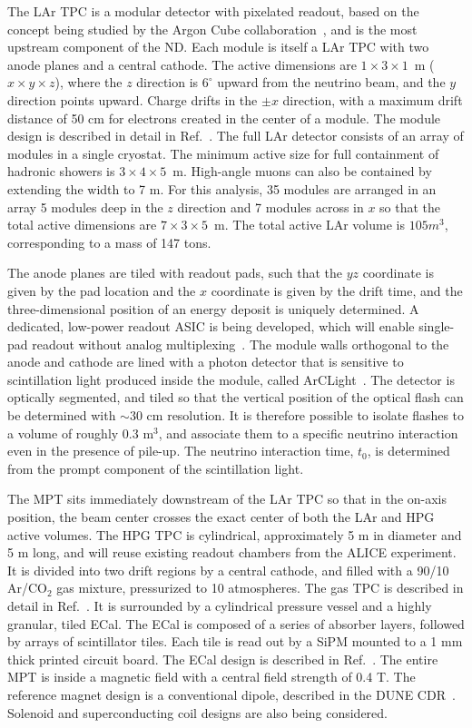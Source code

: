 The LAr TPC is a modular detector with pixelated readout, based on the concept being studied by the Argon Cube collaboration~\cite{ArgonCube}, and is the most upstream component of the ND. Each module is itself a LAr TPC with two anode planes and a central cathode. The active dimensions are $1 \times 3 \times 1$~m ($x \times y \times z$), where the $z$ direction is $6^{\circ}$ upward from the neutrino beam, and the $y$ direction points upward. Charge drifts in the $\pm x$ direction, with a maximum drift distance of 50 cm for electrons created in the center of a module. The module design is described in detail in Ref.~\cite{ArgonCube}. The full LAr detector consists of an array of modules in a single cryostat. The minimum active size for full containment of hadronic showers is $3 \times 4 \times 5$~m. High-angle muons can also be contained by extending the width to 7 m. For this analysis, 35 modules are arranged in an array 5 modules deep in the $z$ direction and 7 modules across in $x$ so that the total active dimensions are $7 \times 3 \times 5$~m. The total active LAr volume is $105 m^{3}$, corresponding to a mass of 147 tons.

The anode planes are tiled with readout pads, such that the $yz$ coordinate is given by the pad location and the $x$ coordinate is given by the drift time, and the three-dimensional position of an energy deposit is uniquely determined. A dedicated, low-power readout ASIC is being developed, which will enable single-pad readout without analog multiplexing~\cite{LArPix}. The module walls orthogonal to the anode and cathode are lined with a photon detector that is sensitive to scintillation light produced inside the module, called ArCLight~\cite{ArCLight}. The detector is optically segmented, and tiled so that the vertical position of the optical flash can be determined with $\sim$30 cm resolution. It is therefore possible to isolate flashes to a volume of roughly 0.3 m$^{3}$, and associate them to a specific neutrino interaction even in the presence of pile-up. The neutrino interaction time, $t_{0}$, is determined from the prompt component of the scintillation light.

The MPT sits immediately downstream of the LAr TPC so that in the on-axis position, the beam center crosses the exact center of both the LAr and HPG active volumes. The HPG TPC is cylindrical, approximately 5 m in diameter and 5 m long, and will reuse existing readout chambers from the ALICE experiment. It is divided into two drift regions by a central cathode, and filled with a 90/10 Ar/CO$_{2}$ gas mixture, pressurized to 10 atmospheres. The gas TPC is described in detail in Ref.~\cite{gasTPC}. It is surrounded by a cylindrical pressure vessel and a highly granular, tiled ECal. The ECal is composed of a series of absorber layers, followed by arrays of scintillator tiles. Each tile is read out by a SiPM mounted to a 1 mm thick printed circuit board. The ECal design is described in Ref.~\cite{CALICEecal}. The entire MPT is inside a magnetic field with a central field strength of 0.4 T. The reference magnet design is a conventional dipole, described in the DUNE CDR~\cite{cdr-vol-4}. Solenoid and superconducting coil designs are also being considered.

